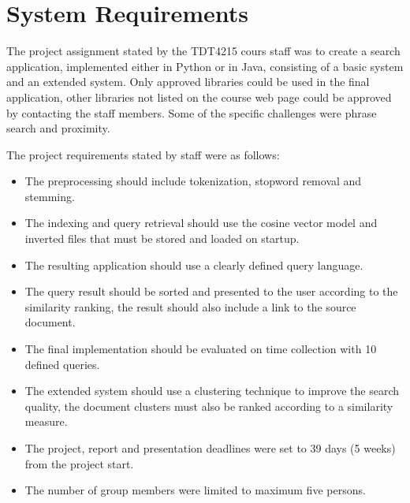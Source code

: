 \chapter{System Requirements}
\label{sec:requirements}
\thispagestyle{fancy}
The project assignment stated by the TDT4215 cours staff was to create a search application, implemented either in Python or in Java, consisting of a basic system and an extended system. Only approved libraries could be used in the final application, other libraries not listed on the course web page could be approved by contacting the staff members. Some of the specific challenges were phrase search and proximity.

The project requirements stated by staff were as follows:
\begin{itemize}
	\item The preprocessing should include tokenization, stopword removal and stemming.
	\item The indexing and query retrieval should use the cosine vector model and inverted files that must be stored and loaded on startup.
	\item The resulting application should use a clearly defined query language.
	\item The query result should be sorted and presented to the user according to the similarity ranking, the result should also include a link to the source document.
	\item The final implementation should be evaluated on time collection with 10 defined queries.
	\item The extended system should use a clustering technique to improve the search quality, the document clusters must also be ranked according to a similarity measure.
	\item The project, report and presentation deadlines were set to 39 days (5 weeks) from the project start.
	\item The number of group members were limited to maximum five persons.
\end{itemize}